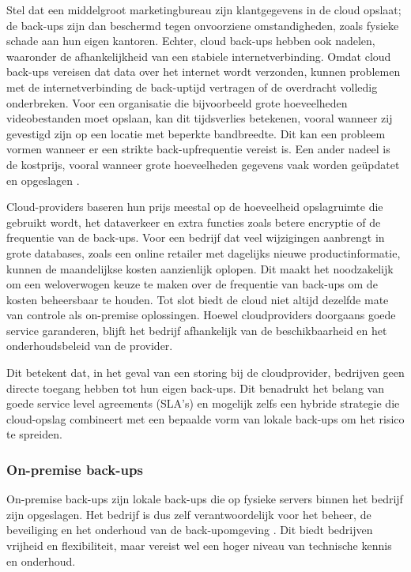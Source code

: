 Stel dat een middelgroot marketingbureau zijn klantgegevens in de cloud opslaat; de back-ups zijn dan beschermd tegen onvoorziene omstandigheden, zoals fysieke schade aan hun eigen kantoren. Echter, cloud back-ups hebben ook nadelen, waaronder de afhankelijkheid van een stabiele internetverbinding. Omdat cloud back-ups vereisen dat data over het internet wordt verzonden, kunnen problemen met de internetverbinding de back-uptijd vertragen of de overdracht volledig onderbreken. Voor een organisatie die bijvoorbeeld grote hoeveelheden videobestanden moet opslaan, kan dit tijdsverlies betekenen, vooral wanneer zij gevestigd zijn op een locatie met beperkte bandbreedte. Dit kan een probleem vormen wanneer er een strikte back-upfrequentie vereist is. Een ander nadeel is de kostprijs, vooral wanneer grote hoeveelheden gegevens vaak worden geüpdatet en opgeslagen \autocite{Obrutsky2016}. 

Cloud-providers baseren hun prijs meestal op de hoeveelheid opslagruimte die gebruikt wordt, het dataverkeer en extra functies zoals betere encryptie of de frequentie van de back-ups. Voor een bedrijf dat veel wijzigingen aanbrengt in grote databases, zoals een online retailer met dagelijks nieuwe productinformatie, kunnen de maandelijkse kosten aanzienlijk oplopen. Dit maakt het noodzakelijk om een weloverwogen keuze te maken over de frequentie van back-ups om de kosten beheersbaar te houden. Tot slot biedt de cloud niet altijd dezelfde mate van controle als on-premise oplossingen. Hoewel cloudproviders doorgaans goede service garanderen, blijft het bedrijf afhankelijk van de beschikbaarheid en het onderhoudsbeleid van de provider. 

Dit betekent dat, in het geval van een storing bij de cloudprovider, bedrijven geen directe toegang hebben tot hun eigen back-ups. Dit benadrukt het belang van goede service level agreements (SLA's) en mogelijk zelfs een hybride strategie die cloud-opslag combineert met een bepaalde vorm van lokale back-ups om het risico te spreiden.

\subsubsection{On-premise back-ups}
On-premise back-ups zijn lokale back-ups die op fysieke servers binnen het bedrijf zijn opgeslagen. Het bedrijf is dus zelf verantwoordelijk voor het beheer, de beveiliging en het onderhoud van de back-upomgeving \autocite{Trovato2019}. Dit biedt bedrijven vrijheid en flexibiliteit, maar vereist wel een hoger niveau van technische kennis en onderhoud. 

